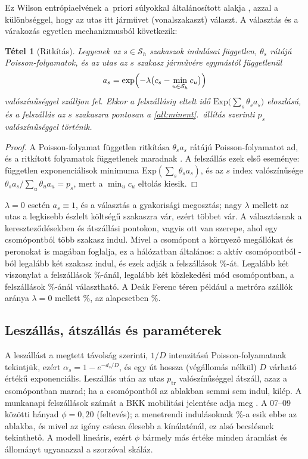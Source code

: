 \documentclass[12pt,a4paper]{article}
\newtheorem{tetel}{Tétel}[section]
\theoremstyle{definition}
\theoremstyle{remark}
\newcommand{\Ss}{\mathcal{S}}
\begin{document}
Ez Wilson entrópiaelvének \citep{wilson1969} a~priori súlyokkal
általánosított alakja \citep{snickars1977}, azzal a különbséggel, hogy az utas
itt járművet (vonalszakaszt) választ. A választás és a várakozás egyetlen
mechanizmusból következik:

\begin{tetel}[Ritkítás]
\label{tet:ritkitas}
Legyenek az $s\in\Ss_h$ szakaszok indulásai független, $\theta_s$ rátájú
Poisson-folyamatok, és az utas az $s$ szakasz járművére egymástól
függetlenül
\[
  a_s=\exp\Bigl(-\lambda\bigl(c_s-\min_{u\in\Ss_h}c_u\bigr)\Bigr)
\]
valószínűséggel szálljon fel. Ekkor a felszállásig eltelt idő
$\mathrm{Exp}\bigl(\sum_s\theta_sa_s\bigr)$ eloszlású, és a felszállás az $s$
szakaszra pontosan a \ref{all:minent}.~állítás szerinti $p_s$
valószínűséggel történik.
\end{tetel}

\begin{proof}
A Poisson-folyamat független ritkítása $\theta_sa_s$ rátájú Poisson-folyamatot
ad, és a ritkított folyamatok függetlenek maradnak \citep{kingman1993}. A
felszállás ezek első eseménye: független exponenciálisok minimuma
$\mathrm{Exp}(\sum_s\theta_sa_s)$, és az $s$ index valószínűsége
$\theta_sa_s/\sum_u\theta_ua_u=p_s$, mert a $\min_uc_u$ eltolás kiesik.
\end{proof}

$\lambda=0$ esetén $a_s\equiv1$, és a választás a gyakorisági megosztás;
nagy $\lambda$ mellett az utas a legkisebb észlelt költségű szakaszra vár,
ezért többet vár. A választásnak a kereszteződésekben és átszállási pontokon,
vagyis ott van szerepe, ahol egy csomópontból több szakasz indul. Mivel a
csomópont a környező megállókat és peronokat is magában foglalja, ez a
hálózatban általános: a \CHACTIVE{} aktív csomópontból \CHMULTI{}-ból
legalább két szakasz indul, és ezek adják a felszállások \CHMULTIB\%-át.
Legalább két viszonylat a felszállások \CHLINEB\%-ánál, legalább két
közlekedési mód \CHMODE{} csomópontban, a felszállások \CHMODEB\%-ánál
választható. A Deák Ferenc téren például a metróra szállók aránya
$\lambda=0$ mellett \DEAKZERO\%, az alapesetben \DEAKBASE\%.

\subsection{Leszállás, átszállás és paraméterek}

A leszállást a megtett távolság szerinti, $1/D$ intenzitású
Poisson-folyamatnak tekintjük, ezért $\alpha_s=1-e^{-d_s/D}$, és egy út hossza
(végállomás nélkül) $D$ várható értékű exponenciális. Leszállás után az utas
$p_{\mathrm{tr}}$ valószínűséggel átszáll, azaz a csomópontban marad; ha a
csomópontból az ablakban semmi sem indul, kilép. A munkanapi felszállások
számát a BKK mobilitási jelentése adja meg \citep{bkk2024}. A 07--09 közötti
hányad $\phi=0{,}20$ (feltevés); a menetrendi indulásoknak \SUPPLYSHARE\%-a
esik ebbe az ablakba, és mivel az igény csúcsa élesebb a kínálaténál, ez
alsó becslésnek tekinthető. A modell lineáris, ezért $\phi$ bármely más értéke
minden áramlást és állományt ugyanazzal a szorzóval skáláz.
\end{document}
